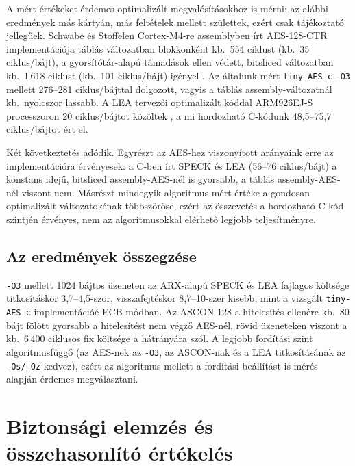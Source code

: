 \documentclass[a4paper,12pt]{report}
\theoremstyle{definition}
\theoremstyle{remark}
\begin{document}
A mért értékeket érdemes optimalizált megvalósításokhoz is mérni; az alábbi eredmények más kártyán, más feltételek mellett születtek, ezért csak tájékoztató jellegűek. Schwabe és Stoffelen Cortex-M4-re assemblyben írt AES-128-CTR implementációja táblás változatban blokkonként kb.\ 554 ciklust (kb.\ 35 ciklus/bájt), a gyorsítótár-alapú támadások ellen védett, bitsliced változatban kb.\ 1\,618 ciklust (kb.\ 101 ciklus/bájt) igényel \cite{SchwabeStoffelen2017}. Az általunk mért \texttt{tiny-AES-c} \texttt{-O3} mellett 276--281 ciklus/bájttal dolgozott, vagyis a táblás assembly-változatnál kb.\ nyolcszor lassabb. A LEA tervezői optimalizált kóddal ARM926EJ-S processzoron 20 ciklus/bájtot közöltek \cite{Hong2013}, a mi hordozható C-kódunk 48,5--75,7 ciklus/bájtot ért el.

Két következtetés adódik. Egyrészt az AES-hez viszonyított arányaink erre az implementációra érvényesek: a C-ben írt SPECK és LEA (56--76 ciklus/bájt) a konstans idejű, bitsliced assembly-AES-nél is gyorsabb, a táblás assembly-AES-nél viszont nem. Másrészt mindegyik algoritmus mért értéke a gondosan optimalizált változatokénak többszöröse, ezért az összevetés a hordozható C-kód szintjén érvényes, nem az algoritmusokkal elérhető legjobb teljesítményre.

\section{Az eredmények összegzése}\label{sec:osszesites}

\texttt{-O3} mellett 1024 bájtos üzeneten az ARX-alapú SPECK és LEA fajlagos költsége titkosításkor 3,7--4,5-ször, visszafejtéskor 8,7--10-szer kisebb, mint a vizsgált \texttt{tiny-AES-c} implementációé ECB módban. Az ASCON-128 a hitelesítés ellenére kb.\ 80 bájt fölött gyorsabb a hitelesítést nem végző AES-nél, rövid üzeneteken viszont a kb.\ 6\,400 ciklusos fix költsége a hátrányára szól. A legjobb fordítási szint algoritmusfüggő (az AES-nek az \texttt{-O3}, az ASCON-nak és a LEA titkosításának az \texttt{-Os/-Oz} kedvez), ezért az algoritmus mellett a fordítási beállítást is mérés alapján érdemes megválasztani.

\chapter{Biztonsági elemzés és összehasonlító értékelés}\label{chap:biztonsag}
\end{document}
